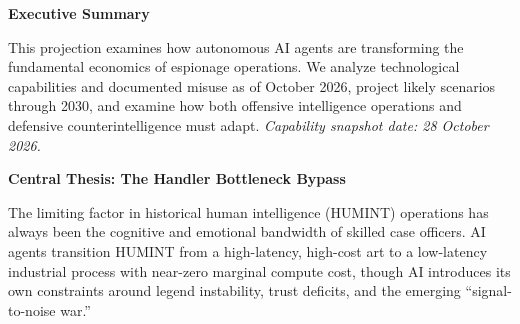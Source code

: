 \documentclass[11pt,letterpaper]{article}
\begin{document}
\thispagestyle{empty}
\vspace*{0.5cm}

\noindent{}

\vspace{0.5cm}
\begin{center}
{\color{shadowdark}\Large\bfseries Executive Summary}
\end{center}
\vspace{0.3cm}

\begin{tcolorbox}[enhanced, colback=lightgray, colframe=steelblue!60, boxrule=1pt, arc=3pt,
  left=10pt, right=10pt, top=10pt, bottom=10pt]
This projection examines how autonomous AI agents are transforming the fundamental economics of espionage operations. We analyze technological capabilities and documented misuse as of October 2026, project likely scenarios through 2030, and examine how both offensive intelligence operations and defensive counterintelligence must adapt. \textit{Capability snapshot date: 28 October 2026.}

\textbf{Central Thesis: The Handler Bottleneck Bypass}

The limiting factor in historical human intelligence (HUMINT) operations has always been the cognitive and emotional bandwidth of skilled case officers. AI agents transition HUMINT from a high-latency, high-cost art to a low-latency industrial process with near-zero marginal compute cost, though AI introduces its own constraints around legend instability, trust deficits, and the emerging ``signal-to-noise war.''
\end{tcolorbox}
\end{document}
